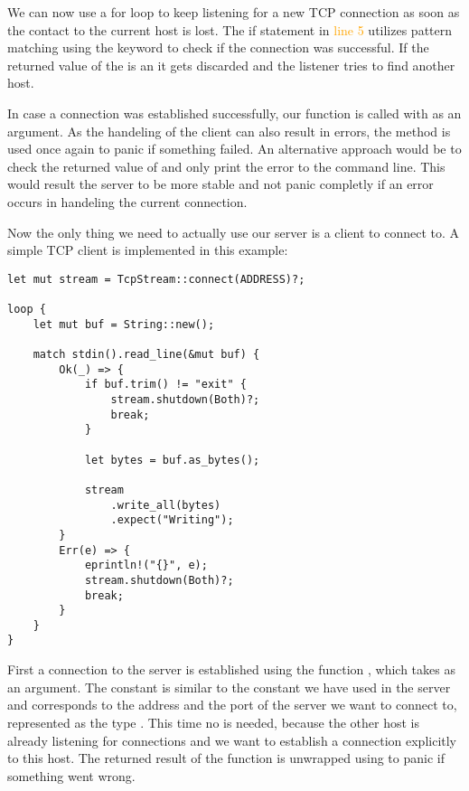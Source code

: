 We can now use a for loop to keep listening for a new TCP connection as soon as the contact to the current host is
lost. The if statement in \textcolor{orange}{line 5} utilizes pattern matching using the keyword  to check
if the connection was successful. If the returned value of the  is an  it gets discarded
and the listener tries to find another host.

In case a connection was established successfully, our function  is called with  as an
argument. As the handeling of the client can also result in errors, the  method is used once again to
panic if something failed. An alternative approach would be to check the returned value of  and
only print the error to the command line. This would result the server to be more stable and not panic completly if an
error occurs in handeling the current connection.

Now the only thing we need to actually use our server is a client to connect to. A simple TCP client is implemented in
this example:

\begin{verbatim}
let mut stream = TcpStream::connect(ADDRESS)?;

loop {
    let mut buf = String::new();

    match stdin().read_line(&mut buf) {
        Ok(_) => {
            if buf.trim() != "exit" {
                stream.shutdown(Both)?;
                break;
            }

            let bytes = buf.as_bytes();

            stream
                .write_all(bytes)
                .expect("Writing");
        }
        Err(e) => {
            eprintln!("{}", e);
            stream.shutdown(Both)?;
            break;
        }
    }
}
\end{verbatim}

First a connection to the server is established using the function , which takes
 as an argument. The constant  is similar to the constant we have used in the server and
corresponds to the address and the port of the server we want to connect to, represented as the type . This
time no  is needed, because the other host is already listening for connections and we want to
establish a connection explicitly to this host. The returned result of the function is unwrapped using  to
panic if something went wrong.

